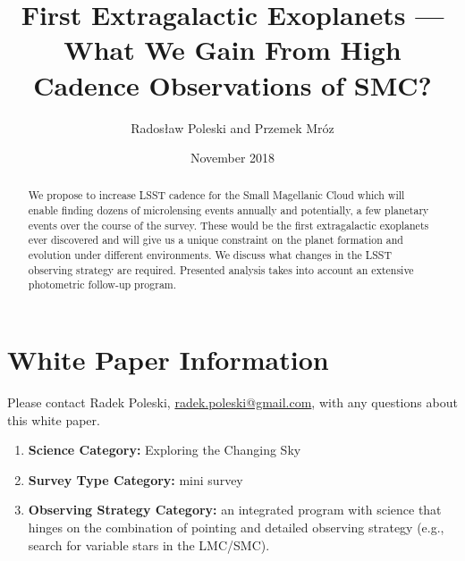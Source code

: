 \documentclass[12pt,letterpaper]{article}
\title{First Extragalactic Exoplanets --- What We Gain From High Cadence Observations of SMC?}
\author{Rados\l{}aw Poleski and Przemek Mr\'oz}
\date{November 2018}
\begin{document}
\maketitle

\begin{abstract}
We propose to increase LSST cadence for the Small Magellanic Cloud which will 
enable finding dozens of microlensing events annually and potentially, a few 
planetary events over the course of the survey.  These would be 
the first extragalactic exoplanets ever discovered and will give us a unique constraint on 
the planet formation and evolution under different environments.  We discuss what changes in 
the LSST observing strategy are required.  Presented analysis takes into account 
an extensive photometric follow-up program. 
\end{abstract}

\section{White Paper Information}
Please contact Radek Poleski, \url{radek.poleski@gmail.com}, with any questions about this white paper.  
\begin{enumerate} 
\item {\bf Science Category:} Exploring the Changing Sky
% 
\item {\bf Survey Type Category:} mini survey
\item {\bf Observing Strategy Category:} %
      an integrated program with science that hinges on the combination of pointing and detailed 
	observing strategy (e.g., search for variable stars in the 
	LMC/SMC). 
\end{enumerate}  
\end{document}
